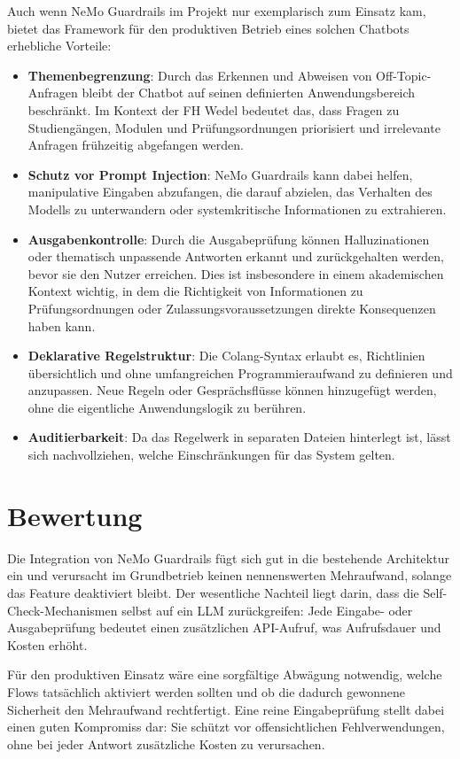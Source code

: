 Auch wenn NeMo Guardrails im Projekt nur exemplarisch zum Einsatz kam, bietet das Framework
für den produktiven Betrieb eines solchen Chatbots erhebliche Vorteile:

\begin{itemize}
    \item \textbf{Themenbegrenzung}: Durch das Erkennen und Abweisen von Off-Topic-Anfragen
    bleibt der Chatbot auf seinen definierten Anwendungsbereich beschränkt. Im Kontext der FH Wedel
    bedeutet das, dass Fragen zu Studiengängen, Modulen und Prüfungsordnungen priorisiert und
    irrelevante Anfragen frühzeitig abgefangen werden.
    \item \textbf{Schutz vor Prompt Injection}: NeMo Guardrails kann dabei helfen, manipulative
    Eingaben abzufangen, die darauf abzielen, das Verhalten des Modells zu unterwandern oder
    systemkritische Informationen zu extrahieren.
    \item \textbf{Ausgabenkontrolle}: Durch die Ausgabeprüfung können Halluzinationen oder
    thematisch unpassende Antworten erkannt und zurückgehalten werden, bevor sie den Nutzer
    erreichen. Dies ist insbesondere in einem akademischen Kontext wichtig, in dem die Richtigkeit
    von Informationen zu Prüfungsordnungen oder Zulassungsvoraussetzungen direkte
    Konsequenzen haben kann.
    \item \textbf{Deklarative Regelstruktur}: Die Colang-Syntax erlaubt es, Richtlinien
    übersichtlich und ohne umfangreichen Programmieraufwand zu definieren und anzupassen.
    Neue Regeln oder Gesprächsflüsse können hinzugefügt werden, ohne die eigentliche
    Anwendungslogik zu berühren.
    \item \textbf{Auditierbarkeit}: Da das Regelwerk in separaten Dateien hinterlegt ist, lässt
    sich nachvollziehen, welche Einschränkungen für das System gelten.
\end{itemize}

\section{Bewertung}

Die Integration von NeMo Guardrails fügt sich gut in die bestehende Architektur ein und
verursacht im Grundbetrieb keinen nennenswerten Mehraufwand, solange das Feature deaktiviert bleibt.
Der wesentliche Nachteil liegt darin, dass die Self-Check-Mechanismen selbst auf ein LLM zurückgreifen:
Jede Eingabe- oder Ausgabeprüfung bedeutet einen zusätzlichen API-Aufruf, was Aufrufsdauer und Kosten erhöht.

Für den produktiven Einsatz wäre eine sorgfältige Abwägung notwendig, welche Flows tatsächlich
aktiviert werden sollten und ob die dadurch gewonnene Sicherheit den Mehraufwand rechtfertigt.
Eine reine Eingabeprüfung stellt dabei einen guten Kompromiss dar:
Sie schützt vor offensichtlichen Fehlverwendungen, ohne bei jeder Antwort zusätzliche Kosten
zu verursachen.
